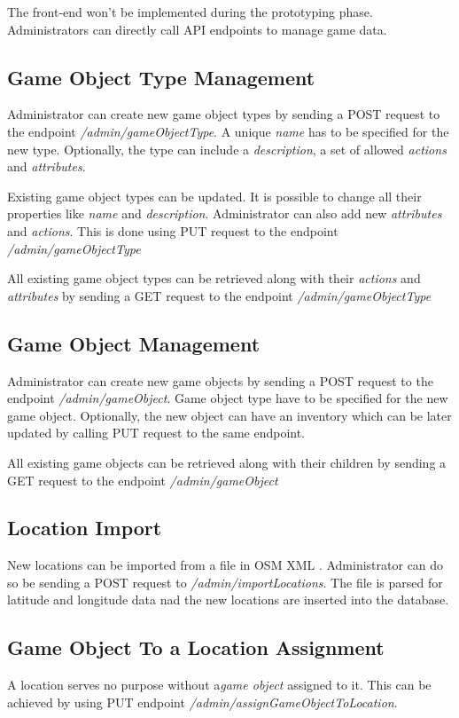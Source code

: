 	The front-end won't be implemented during the prototyping phase. Administrators can directly call API endpoints to manage game data.	

	\subsection{Game Object Type Management}
	Administrator can create new game object types by sending a POST request to the endpoint \textit{/admin/gameObjectType}. A unique \textit{name} has to be specified for the new type. Optionally, the type can include a \textit{description}, a set of allowed \textit{actions} and \textit{attributes}.
	
	Existing game object types can be updated. It is possible to change all their properties like \textit{name} and \textit{description}. Administrator can also add new \textit{attributes} and \textit{actions}. This is done using PUT request to the endpoint \textit{/admin/gameObjectType}
		
	All existing game object types can be retrieved along with their \textit{actions} and \textit{attributes} by sending a GET request to the endpoint \textit{/admin/gameObjectType}
	
	\subsection{Game Object Management}
	Administrator can create new game objects by sending a POST request to the endpoint \textit{/admin/gameObject}. Game object type have to be specified for the new game object. Optionally, the new object can have an inventory which can be later updated by calling PUT request to the same endpoint.
	
	All existing game objects can be retrieved along with their children by sending a GET request to the endpoint \textit{/admin/gameObject}
	
	\subsection{Location Import}
	New locations can be imported from a file in OSM XML \cite{osmxml}. Administrator can do so be sending a POST request to \textit{/admin/importLocations}. The file is parsed for latitude and longitude data nad the new locations are inserted into the database.
	
	\subsection{Game Object To a Location Assignment}
	A location serves no purpose without a\textit{game object} assigned to it. This can be achieved by using PUT endpoint 
	\textit{/admin/assignGameObjectToLocation}.
	
